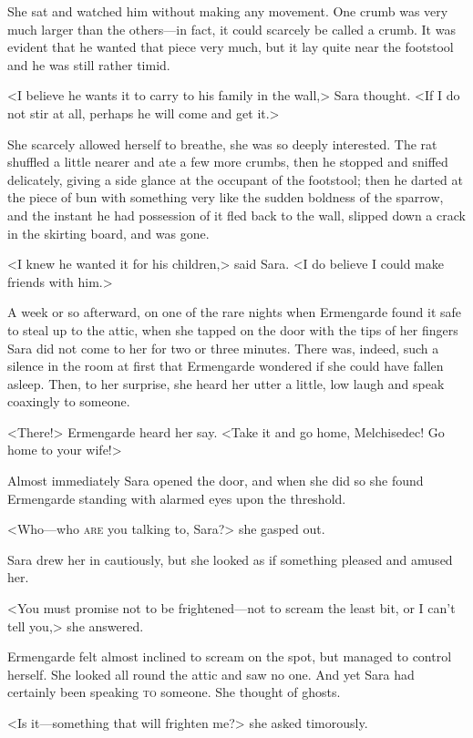 She sat and watched him without making any movement. One crumb was very much larger than the others—in fact, it could scarcely be called a crumb. It was evident that he wanted that piece very much, but it lay quite near the footstool and he was still rather timid.

<I believe he wants it to carry to his family in the wall,> Sara thought. <If I do not stir at all, perhaps he will come and get it.>

She scarcely allowed herself to breathe, she was so deeply interested. The rat shuffled a little nearer and ate a few more crumbs, then he stopped and sniffed delicately, giving a side glance at the occupant of the footstool; then he darted at the piece of bun with something very like the sudden boldness of the sparrow, and the instant he had possession of it fled back to the wall, slipped down a crack in the skirting board, and was gone.

<I knew he wanted it for his children,> said Sara. <I do believe I could make friends with him.>

A week or so afterward, on one of the rare nights when Ermengarde found it safe to steal up to the attic, when she tapped on the door with the tips of her fingers Sara did not come to her for two or three minutes. There was, indeed, such a silence in the room at first that Ermengarde wondered if she could have fallen asleep. Then, to her surprise, she heard her utter a little, low laugh and speak coaxingly to someone.

<There!> Ermengarde heard her say. <Take it and go home, Melchisedec! Go home to your wife!>

Almost immediately Sara opened the door, and when she did so she found Ermengarde standing with alarmed eyes upon the threshold.

<Who—who \textsc{are} you talking to, Sara?> she gasped out.

Sara drew her in cautiously, but she looked as if something pleased and amused her.

<You must promise not to be frightened—not to scream the least bit, or I can't tell you,> she answered.

Ermengarde felt almost inclined to scream on the spot, but managed to control herself. She looked all round the attic and saw no one. And yet Sara had certainly been speaking \textsc{to} someone. She thought of ghosts.

<Is it—something that will frighten me?> she asked timorously.


